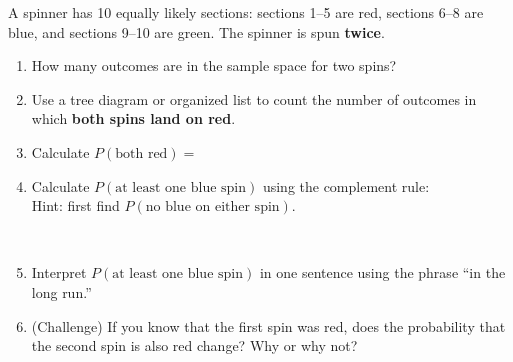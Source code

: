 \documentclass[10pt]{article}
\begin{document}
\begin{tcolorbox}
\end{tcolorbox}

\vspace{0.1in}

\begin{tcolorbox}[colback=sky, colframe=navy, boxrule=1pt, arc=2mm,
    left=4mm, right=4mm, top=3mm, bottom=3mm,
    title={\bfseries Tier E \enspace Extension --- Multi-Stage Sample Spaces}]
\small

A spinner has 10 equally likely sections: sections 1--5 are red, sections 6--8 are
blue, and sections 9--10 are green. The spinner is spun \textbf{twice}.

\begin{enumerate}[leftmargin=1.5em, itemsep=10pt]
  \item How many outcomes are in the sample space for two spins? 
  \item Use a tree diagram or organized list to count the number of outcomes in which
        \textbf{both spins land on red}.
        \par\noindent\begin{minipage}[t][40pt][t]{\linewidth}\end{minipage}
  \item Calculate $P(\text{both red}) = $ 
  \item Calculate $P(\text{at least one blue spin}) $ using the complement rule:\\
        Hint: first find $P(\text{no blue on either spin})$.
        \par\noindent\begin{minipage}[t][40pt][t]{\linewidth}\\
        \end{minipage}
  \item Interpret $P(\text{at least one blue spin})$ in one sentence using the phrase
        ``in the long run.''\\
  \item (Challenge) If you know that the first spin was red, does the probability that
        the second spin is also red change? Why or why not?\\
\end{enumerate}

\end{tcolorbox}
\end{document}
